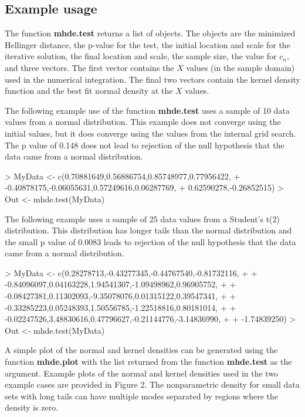 \documentclass{article}
\begin{document}
\subsection{Example usage}

The function \textbf{mhde.test} returns a list of objects.  The objects are the minimized Hellinger distance, the p-value for the test, the initial location and scale for the iterative solution, the final location and scale, the sample size, the value for $c_n$, and three vectors.  The first vector contains the $X$ values (in the sample domain) used in the numerical integration.  The final two vectors contain the kernel density function and the best fit normal density at the $X$ values.

The following example use of the function \textbf{mhde.test} uses a sample of 10 data values from a normal distribution.  This example does not converge using the initial values, but it does converge using the values from the internal grid search.  The p value of 0.148 does not lead to rejection of the null hypothesis that the data came from a normal distribution.

\begin{Schunk}
\begin{Sinput}
> MyData <- c(0.70881649,0.56886754,0.85748977,0.77956422,
+ -0.40878175,-0.06055631,0.57249616,0.06287769,
+ 0.62590278,-0.26852515)
> Out <- mhde.test(MyData)
\end{Sinput}
\end{Schunk}

The following example uses a sample of 25 data values from a Student's t(2) distribution.  This distribution has longer tails than the normal distribution and the small p value of 0.0083 leads to rejection of the null hypothesis that the data came from a normal distribution.

\begin{Schunk}
\begin{Sinput}
> MyData <- c(0.28278713,-0.43277345,-0.44767540,-0.81732116,
+ +   -0.84096097,0.04163228,1.94541307,-1.09498962,0.96905752,
+ +   -0.08427381,0.11302093,-9.35078076,0.01315122,0.39547341,
+ +   -0.33285223,0.05248393,1.50556785,-1.22518816,0.80181014,
+ +   -0.02247526,3.48830616,0.47796627,-0.21144776,-3.14836990,
+ +   -1.74839250)
> Out <- mhde.test(MyData)
\end{Sinput}
\end{Schunk}

A simple plot of the normal and kernel densities can be generated using the function \textbf{mhde.plot} with the list returned from the function \textbf{mhde.test} as the argument.  Example plots of the normal and kernel densities used in the two example cases are provided in Figure 2.  The nonparametric density for small data sets with long tails can have multiple modes separated by regions where the density is zero.
\end{document}
